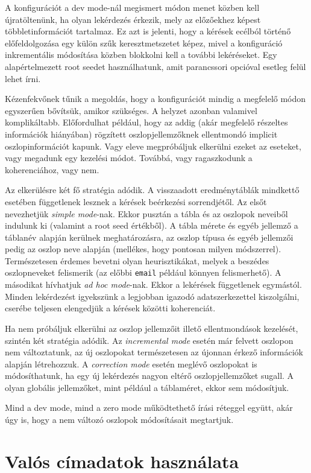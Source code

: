 \documentclass[
    parspace,
    noindent,
    nohyp,
]{elteiktdk}[2023/04/10]
\begin{document}
A konfigurációt a dev mode-nál megismert módon menet közben kell újratöltenünk,
ha olyan lekérdezés érkezik, mely az előzőekhez képest többletinformációt tartalmaz.
Ez azt is jelenti, hogy a kérések ecélból történő előfeldolgozása
egy külön szűk keresztmetszetet képez,
mivel a konfiguráció inkrementális módosítása közben blokkolni kell a további lekéréseket.
Egy alapértelmezett root seedet használhatunk,
amit parancssori opcióval esetleg felül lehet írni.

Kézenfekvőnek tűnik a megoldás, hogy a konfigurációt
mindig a megfelelő módon egyszerűen bővítsük, amikor szükséges.
A helyzet azonban valamivel komplikáltabb.
Előfordulhat például, hogy az addig (akár megfelelő részeltes információk hiányában) rögzített
oszlopjellemzőknek ellentmondó implicit oszlopinformációt kapunk.
Vagy eleve megpróbáljuk elkerülni ezeket az eseteket,
vagy megadunk egy kezelési módot.
Továbbá, vagy ragaszkodunk a koherenciához, vagy nem.

Az elkerülésre két fő stratégia adódik.
A visszaadott eredménytáblák mindkettő esetében függetlenek lesznek
a kérések beérkezési sorrendjétől.
Az elsőt nevezhetjük \textit{simple mode}-nak.
Ekkor pusztán a tábla és az oszlopok neveiből indulunk ki
(valamint a root seed értékből).
A tábla mérete és egyéb jellemző a táblanév alapján kerülnek meghatározásra,
az oszlop típusa és egyéb jellemzői pedig az oszlop neve alapján
(mellékes, hogy pontosan milyen módszerrel).
Természetesen érdemes bevetni olyan heurisztikákat,
melyek a beszédes oszlopneveket felismerik
(az előbbi \texttt{email} például könnyen felismerhető).
A másodikat hívhatjuk \textit{ad hoc mode}-nak.
Ekkor a lekérések függetlenek egymástól.
Minden lekérdezést igyekszünk a legjobban igazodó adatszerkezettel kiszolgálni,
cserébe teljesen elengedjük a kérések közötti koherenciát.

Ha nem próbáljuk elkerülni az oszlop jellemzőit illető ellentmondások kezelését,
szintén két stratégia adódik.
Az \textit{incremental mode} esetén már felvett oszlopon nem változtatunk,
az új oszlopokat természetesen az újonnan érkező információk alapján létrehozzuk.
A \textit{correction mode} esetén meglévő oszlopokat is módosíthatunk,
ha egy új lekérdezés nagyon eltérő oszlopjellemzőket sugall.
A olyan globális jellemzőket, mint például a táblaméret, ekkor sem módosítjuk.

Mind a dev mode, mind a zero mode működtethető írási réteggel együtt,
akár úgy is, hogy a nem változó oszlopok módosításait megtartjuk.

\section{Valós címadatok használata}
\end{document}
